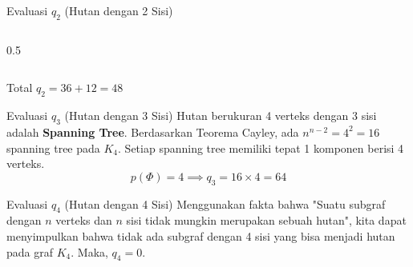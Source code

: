 \documentclass[aspectratio=169]{beamer}
\begin{document}
\begin{frame}[fragile]{Evaluasi $q_2$ (Hutan dengan 2 Sisi)}
\begin{columns}[T]
\begin{column}{0.5\textwidth}
\begin{center}
      \end{center}
    \end{column}
  \end{columns}

  \vspace{0.3cm}
  \begin{center}
    Total $q_2 = 36 + 12 = 48$
  \end{center}
\end{frame}

\begin{frame}[fragile]{Evaluasi $q_3$ (Hutan dengan 3 Sisi)}
  Hutan berukuran 4 verteks dengan 3 sisi adalah \textbf{Spanning Tree}.  Berdasarkan Teorema Cayley, ada $n^{n-2} = 4^2 = 16$ spanning tree pada $K_4$. Setiap spanning tree memiliki tepat 1 komponen berisi 4 verteks.
  $$ p(\Phi) = 4 \implies q_3 = 16 \times 4 = 64 $$

  \begin{center}
  \end{center}
\end{frame}

\begin{frame}{Evaluasi $q_4$ (Hutan dengan 4 Sisi)}
  Menggunakan fakta bahwa "Suatu subgraf dengan $n$ verteks dan $n$ sisi tidak mungkin merupakan sebuah hutan", kita dapat menyimpulkan bahwa tidak ada subgraf dengan 4 sisi yang bisa menjadi hutan pada graf $K_4$.
  Maka, $q_4 = 0$.
\end{frame}
\end{document}
